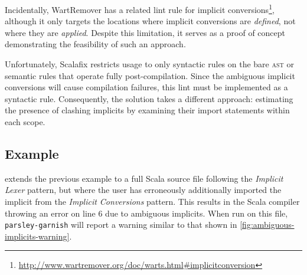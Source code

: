 \documentclass[../../main.tex]{subfiles}
\begin{document}
Incidentally, WartRemover has a related lint rule for implicit conversions\footnote{\url{http://www.wartremover.org/doc/warts.html#implicitconversion}},
although it only targets the locations where implicit conversions are \emph{defined}, not where they are \emph{applied}.
Despite this limitation, it serves as a proof of concept demonstrating the feasibility of such an approach.

Unfortunately, Scalafix restricts usage to only syntactic rules on the bare \textsc{ast} or semantic rules that operate fully post-compilation.
Since the ambiguous implicit conversions will cause compilation failures, this lint must be implemented as a syntactic rule.
Consequently, the solution takes a different approach: estimating the presence of clashing implicits by examining their import statements within each scope.

\subsection*{Example}
 extends the previous example to a full Scala source file following the \emph{Implicit Lexer} pattern,
but where the user has erroneously additionally imported the  implicit from the \emph{Implicit Conversions} pattern.
This results in the Scala compiler throwing an error on line 6 due to ambiguous implicits.
When run on this file, \texttt{parsley-garnish} will report a warning similar to that shown in \cref{fig:ambiguous-implicits-warning}.
\end{document}
